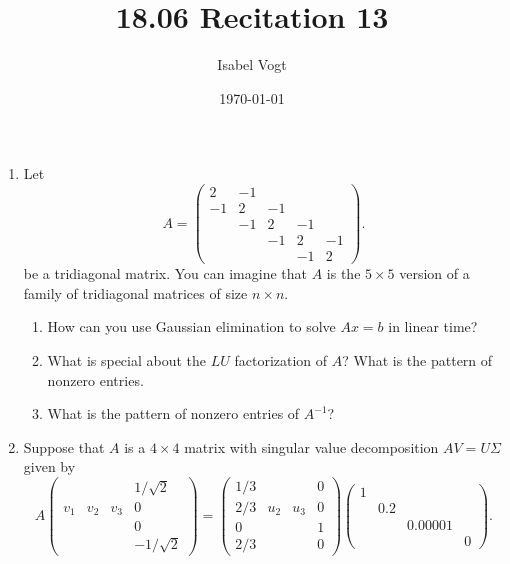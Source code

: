 \documentclass[11pt]{article}
\title{18.06 Recitation 13}
\author{Isabel Vogt}
\date{\today}                                           %
\begin{document}
\maketitle

\begin{enumerate}


\item Let 
\[A = \begin{pmatrix} 2 & -1 & & &  \\-1 & 2 & -1 && \\ & -1 & 2 & -1 & \\ && -1 & 2 & -1 \\ && &-1 & 2 \end{pmatrix}. \]
be a tridiagonal matrix.  You can imagine that $A$ is the $5 \times 5$ version of a family of tridiagonal matrices of size $n \times n$.

\begin{enumerate}

\item  How can you use Gaussian elimination to solve $Ax = b$ in linear time?

\item What is special about the $LU$ factorization of $A$?  What is the pattern of nonzero entries.

\item What is the pattern of nonzero entries of $A^{-1}$?


\end{enumerate}


\item Suppose that $A$ is a $4 \times 4$ matrix with singular value decomposition $AV = U \Sigma$ given by 
\[A \begin{pmatrix}  & && 1/\sqrt{2} \\ v_1 & v_2& v_3& 0 \\  &&& 0 \\  & && -1/\sqrt{2} \end{pmatrix} = \begin{pmatrix} 1/3 & && 0 \\ 2/3 & u_2& u_3& 0 \\ 0 &&& 1 \\ 2/3 & && 0 \end{pmatrix} \begin{pmatrix} 1 &&& \\ & 0.2 && \\ && 0.00001 & \\ &&& 0 \end{pmatrix}.\]


\end{enumerate}
\end{document}
